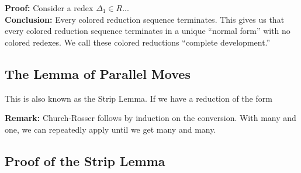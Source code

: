 \textbf{Proof:} Consider a redex $\Delta_1 \in R$...\\

\textbf{Conclusion:} Every colored reduction sequence terminates. This gives us that every colored reduction sequence terminates in a unique ``normal form'' with no colored redexes. We call these colored reductions ``complete development.''

\subsection{The Lemma of Parallel Moves}
This is also known as the Strip Lemma. If we have a reduction of the form
\begin{center}
\end{center}

\textbf{Remark:} Church-Rosser follows by induction on the conversion. With many and one, we can repeatedly apply until we get many and many.\\

\subsection{Proof of the Strip Lemma}
